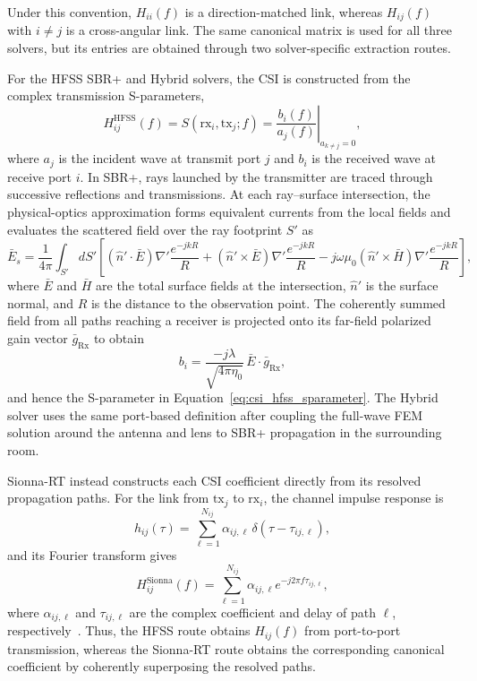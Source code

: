 Under this convention, $H_{ii}(f)$ is a direction-matched link, whereas $H_{ij}(f)$ with $i\neq j$ is a cross-angular link. The same canonical matrix is used for all three solvers, but its entries are obtained through two solver-specific extraction routes.

For the HFSS SBR+ and Hybrid solvers, the CSI is constructed from the complex transmission S-parameters,
\begin{equation}
    H_{ij}^{\mathrm{HFSS}}(f)
    =S(\mathrm{rx}_i,\mathrm{tx}_j;f)
    =\left.\frac{b_i(f)}{a_j(f)}\right|_{a_{k\neq j}=0},
    \label{eq:csi_hfss_sparameter}
\end{equation}
where $a_j$ is the incident wave at transmit port $j$ and $b_i$ is the received wave at receive port $i$. In SBR+, rays launched by the transmitter are traced through successive reflections and transmissions. At each ray--surface intersection, the physical-optics approximation forms equivalent currents from the local fields and evaluates the scattered field over the ray footprint $S'$ as
\begin{equation}
    \bar{E}_s = \frac{1}{4\pi}\int_{S'} dS' \left[ (\hat{n}'\cdot\bar{E})\nabla'\frac{e^{-jkR}}{R} + (\hat{n}'\times\bar{E})\nabla'\frac{e^{-jkR}}{R} - j\omega\mu_0(\hat{n}'\times\bar{H})\nabla'\frac{e^{-jkR}}{R} \right],
    \label{eq:sbr_scattered_field}
\end{equation}
where $\bar{E}$ and $\bar{H}$ are the total surface fields at the intersection, $\hat{n}'$ is the surface normal, and $R$ is the distance to the observation point. The coherently summed field from all paths reaching a receiver is projected onto its far-field polarized gain vector $\bar{g}_{\mathrm{Rx}}$ to obtain
\begin{equation}
    b_i = \frac{-j\lambda}{\sqrt{4\pi\eta_0}}\,\bar{E}\cdot\bar{g}_{\mathrm{Rx}},
    \label{eq:sbr_received_signal}
\end{equation}
and hence the S-parameter in Equation~\ref{eq:csi_hfss_sparameter}. The Hybrid solver uses the same port-based definition after coupling the full-wave FEM solution around the antenna and lens to SBR+ propagation in the surrounding room.

Sionna-RT instead constructs each CSI coefficient directly from its resolved propagation paths. For the link from $\mathrm{tx}_j$ to $\mathrm{rx}_i$, the channel impulse response is
\begin{equation}
    h_{ij}(\tau)=\sum_{\ell=1}^{N_{ij}}\alpha_{ij,\ell}\,
    \delta\!\left(\tau-\tau_{ij,\ell}\right),
    \label{eq:cir}
\end{equation}
and its Fourier transform gives
\begin{equation}
    H_{ij}^{\mathrm{Sionna}}(f)=
    \sum_{\ell=1}^{N_{ij}}\alpha_{ij,\ell}
    e^{-j2\pi f\tau_{ij,\ell}},
    \label{eq:cfr}
\end{equation}
where $\alpha_{ij,\ell}$ and $\tau_{ij,\ell}$ are the complex coefficient and delay of path $\ell$, respectively~\cite{NVIDIACorporation2026,Tse2005}. Thus, the HFSS route obtains $H_{ij}(f)$ from port-to-port transmission, whereas the Sionna-RT route obtains the corresponding canonical coefficient by coherently superposing the resolved paths.

